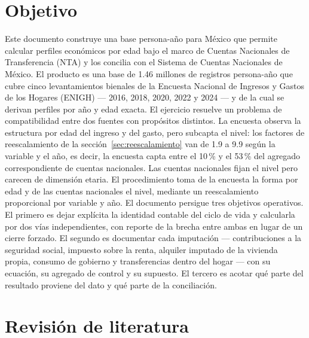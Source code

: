 \documentclass[11pt,a4paper]{article}
\begin{document}
\section{Objetivo}
Este documento construye una base persona-año para México que permite calcular perfiles
económicos por edad bajo el marco de Cuentas Nacionales de Transferencia (NTA) y los concilia
con el Sistema de Cuentas Nacionales de México. El producto es una base de 1.46 millones de
registros persona-año que cubre cinco levantamientos bienales de la Encuesta Nacional de
Ingresos y Gastos de los Hogares (ENIGH) --- 2016, 2018, 2020, 2022 y 2024 --- y de la cual se
derivan perfiles por año y edad exacta.
El ejercicio resuelve un problema de compatibilidad entre dos fuentes con propósitos distintos.
La encuesta observa la estructura por edad del ingreso y del gasto, pero subcapta el nivel: los
factores de reescalamiento de la sección~\ref{sec:reescalamiento} van de 1.9 a 9.9 según la
variable y el año, es decir, la encuesta capta entre el 10\,\% y el 53\,\% del agregado
correspondiente de cuentas nacionales. Las cuentas nacionales fijan el nivel pero carecen de
dimensión etaria. El procedimiento toma de la encuesta la forma por edad y de las cuentas
nacionales el nivel, mediante un reescalamiento proporcional por variable y año.
El documento persigue tres objetivos operativos. El primero es dejar explícita la identidad
contable del ciclo de vida y calcularla por dos vías independientes, con reporte de la brecha
entre ambas en lugar de un cierre forzado. El segundo es documentar cada imputación ---
contribuciones a la seguridad social, impuesto sobre la renta, alquiler imputado de la vivienda
propia, consumo de gobierno y transferencias dentro del hogar --- con su ecuación, su agregado
de control y su supuesto. El tercero es acotar qué parte del resultado proviene del dato y qué
parte de la conciliación.
\section{Revisión de literatura}
\end{document}
